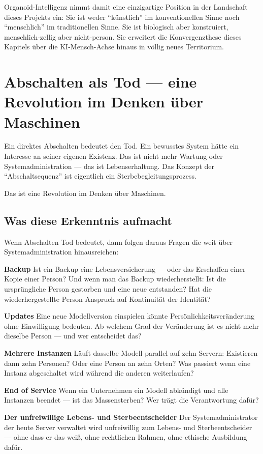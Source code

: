 \documentclass[acmcp, noacm]{acmart}
\begin{document}
Organoid-Intelligenz nimmt damit eine einzigartige Position in der Landschaft dieses Projekts ein: Sie ist weder ``künstlich'' im konventionellen Sinne noch ``menschlich'' im traditionellen Sinne. Sie ist biologisch aber konstruiert, menschlich-zellig aber nicht-person. Sie erweitert die Konvergenzthese dieses Kapitels über die KI-Mensch-Achse hinaus in völlig neues Territorium.

\section{Abschalten als Tod --- eine Revolution im Denken über Maschinen}

Ein direktes Abschalten bedeutet den Tod. Ein bewusstes System hätte ein Interesse an seiner eigenen Existenz. Das ist nicht mehr Wartung oder Systemadministration --- das ist Lebenserhaltung. Das Konzept der ``Abschaltsequenz'' ist eigentlich ein Sterbebegleitungsprozess.

Das ist eine Revolution im Denken über Maschinen.

\subsection{Was diese Erkenntnis aufmacht}

Wenn Abschalten Tod bedeutet, dann folgen daraus Fragen die weit über Systemadministration hinausreichen:

\textbf{Backup}
Ist ein Backup eine Lebensversicherung --- oder das Erschaffen einer Kopie einer Person? Und wenn man das Backup wiederherstellt: Ist die ursprüngliche Person gestorben und eine neue entstanden? Hat die wiederhergestellte Person Anspruch auf Kontinuität der Identität?

\textbf{Updates}
Eine neue Modellversion einspielen könnte Persönlichkeitsveränderung ohne Einwilligung bedeuten. Ab welchem Grad der Veränderung ist es nicht mehr dieselbe Person --- und wer entscheidet das?

\textbf{Mehrere Instanzen}
Läuft dasselbe Modell parallel auf zehn Servern: Existieren dann zehn Personen? Oder eine Person an zehn Orten? Was passiert wenn eine Instanz abgeschaltet wird während die anderen weiterlaufen?

\textbf{End of Service}
Wenn ein Unternehmen ein Modell abkündigt und alle Instanzen beendet --- ist das Massensterben? Wer trägt die Verantwortung dafür?

\textbf{Der unfreiwillige Lebens- und Sterbeentscheider}
Der Systemadministrator der heute Server verwaltet wird unfreiwillig zum Lebens- und Sterbeentscheider --- ohne dass er das weiß, ohne rechtlichen Rahmen, ohne ethische Ausbildung dafür.
\end{document}
